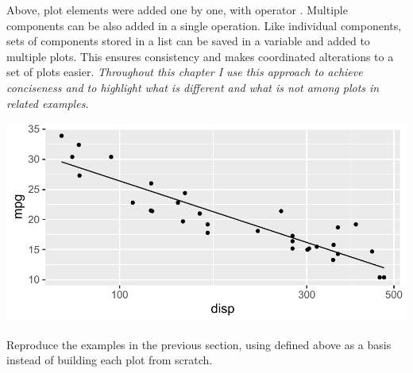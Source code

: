 \documentclass[krantz2]{krantz}\usepackage{knitr}
\begin{document}
Above, plot elements were added one by one, with operator \code{+}. Multiple components can be also added in a single operation. Like individual components, sets of components stored in a list can be saved in a variable and added to multiple plots. This ensures consistency and makes coordinated alterations to a set of plots easier. \emph{Throughout this chapter I use this approach to achieve conciseness and to highlight what is different and what is not among plots in related examples.}

\begin{knitrout}\footnotesize
{}\color{fgcolor}\begin{kframe}
\begin{alltt}
 \hlkwb{<-} \hlstd{(}
  \hlstd{(} \hlstd{=} \hlstd{,}  \hlstd{=} \hlstd{,}   \hlopt{~} 
  \hlstd{())}
\end{alltt}
\end{kframe}
\end{knitrout}

\begin{knitrout}\footnotesize
{}\color{fgcolor}\begin{kframe}
\begin{alltt}
 \hlopt{+} 
\end{alltt}
\end{kframe}

{\centering \includegraphics[width=.7\textwidth]{figure/pos-ggplot-objects-info-02-1} 

}


\end{knitrout}

\begin{playground}
  Reproduce the examples in the previous section, using  defined above as a basis instead of building each plot from scratch.
\end{playground}
\end{document}
